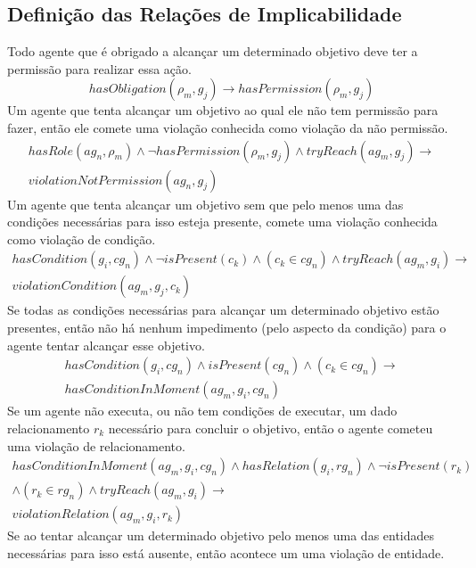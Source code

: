 \documentclass[12pt]{article}
\begin{document}
\subsection{Definição das Relações de Implicabilidade}

Todo agente que é obrigado a alcançar um determinado objetivo deve ter a permissão para realizar essa ação.
\begin{equation}\label{rel1}
	hasObligation(\rho_m,g_j) \to hasPermission(\rho_m,g_j)  
\end{equation}
Um agente que tenta alcançar um objetivo ao qual ele não tem permissão para fazer, então ele comete uma violação conhecida como violação da não permissão.
\begin{eqnarray}\label{rel2}\nonumber
	hasRole(ag_n,\rho_m) \wedge \neg hasPermission(\rho_m,g_j) \wedge tryReach(ag_m,g_j) \to \\ violationNotPermission(ag_n,g_j)
\end{eqnarray}
Um agente que tenta alcançar um objetivo sem que pelo menos uma das condições necessárias para isso esteja presente, comete uma violação conhecida como violação de condição.
\begin{eqnarray}\label{rel3}\nonumber
	hasCondition(g_i,cg_n) \wedge \neg isPresent(c_k) \wedge (c_k \in cg_n) \wedge tryReach(ag_m,g_i) \to \\ 
	violationCondition(ag_m,g_j,c_k) 
\end{eqnarray}
Se todas as condições necessárias para alcançar um determinado objetivo estão presentes, então não há nenhum impedimento (pelo aspecto da condição) para o agente tentar alcançar esse objetivo.  
\begin{eqnarray}\nonumber
	hasCondition(g_i,cg_n) \wedge isPresent(cg_n) \wedge (c_k \in cg_n) \to \\ 
	hasConditionInMoment(ag_m,g_i,cg_n) 
\end{eqnarray}
Se um agente não executa, ou não tem condições de executar, um dado relacionamento $r_k$ necessário para concluir o objetivo, então o agente cometeu uma violação de relacionamento. 
\begin{eqnarray}\nonumber
	hasConditionInMoment(ag_m,g_i,cg_n)  \wedge hasRelation(g_i,rg_n)\wedge \neg isPresent(r_k)  \nonumber \\ 
	\wedge (r_k \in rg_n) \wedge tryReach(ag_m,g_i) \to \nonumber \\ 
	violationRelation(ag_m,g_i,r_k) 
\end{eqnarray}
Se ao tentar alcançar um determinado objetivo pelo menos uma das entidades necessárias para isso está ausente, então acontece um uma violação de entidade. 
\end{document}
